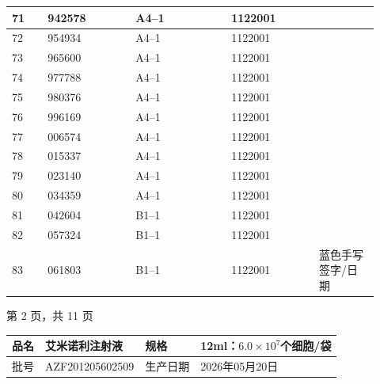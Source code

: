\documentclass[UTF8,10pt,a4paper,fontset=fandol]{ctexart}
\newcommand{\fieldvalue}[1]{#1}
\newcommand{\handwritten}[1]{#1}
\begin{document}
\begin{center}
\begin{tabular}{|p{0.09\linewidth}|p{0.22\linewidth}|p{0.24\linewidth}|p{0.22\linewidth}|p{0.15\linewidth}|}
71 & 942578 & A4--1 & 1122001 & \\ \hline
72 & 954934 & A4--1 & 1122001 & \\ \hline
73 & 965600 & A4--1 & 1122001 & \\ \hline
74 & 977788 & A4--1 & 1122001 & \\ \hline
75 & 980376 & A4--1 & 1122001 & \\ \hline
76 & 996169 & A4--1 & 1122001 & \\ \hline
77 & 006574 & A4--1 & 1122001 & \\ \hline
78 & 015337 & A4--1 & 1122001 & \\ \hline
79 & 023140 & A4--1 & 1122001 & \\ \hline
80 & 034359 & A4--1 & 1122001 & \\ \hline
81 & 042604 & B1--1 & 1122001 & \\ \hline
82 & 057324 & B1--1 & 1122001 & \\ \hline
83 & 061803 & B1--1 & 1122001 &
\fieldvalue{\handwritten{蓝色手写签字/日期}}
\\ \hline
\end{tabular}

\vspace{0.4em}

第 2 页，共 11 页
\end{center}

\newpage

\begin{tabular}{|p{1.8cm}|p{4.0cm}|p{1.4cm}|p{4.0cm}|}
\hline
品名 &
\fieldvalue{艾米诺利注射液} &
规格 &
\fieldvalue{12ml：$6.0\times10^{7}$个细胞/袋}
\\
\hline
批号 &
\fieldvalue{AZF201205602509} &
生产日期 &
\fieldvalue{2026年05月20日}
\\
\hline
\end{tabular}

\vspace{2pt}
\end{document}
